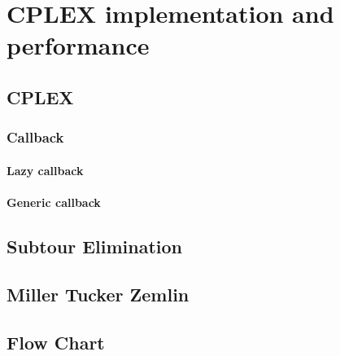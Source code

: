 \chapter{CPLEX implementation and performance}

\section{CPLEX}
\subsection{Callback}
\subsubsection{Lazy callback}
\subsubsection{Generic callback}

\section{Subtour Elimination}

\section{Miller Tucker Zemlin}

\section{Flow Chart}
